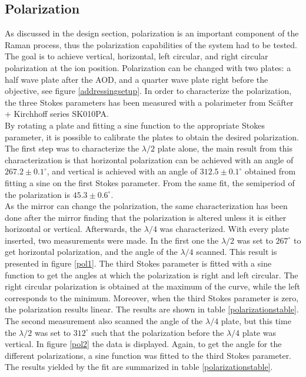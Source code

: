 \subsection{Polarization}
As discussed in the design section, polarization is an important component of the Raman process, thus the polarization capabilities of the system had to be tested. The goal is to achieve vertical, horizontal, left circular, and right circular polarization at the ion position. Polarization can be changed with two plates: a half wave plate after the AOD, and a quarter wave plate right before the objective, see figure \ref{addressingsetup}. In order to characterize the polarization, the three Stokes parameters \cite{stokes} has been measured with a polarimeter from Sc\"after + Kirchhoff series SK010PA.\\
By rotating a plate and fitting a sine function to the appropriate Stokes parameter, it is possible to calibrate the plates to obtain the desired polarization. The first step was to characterize the $\lambda/2$ plate alone, the main result from this characterization is that horizontal polarization can be achieved with an angle of $267.2\pm 0.1 ^{\circ}$, and vertical is achieved with an angle of $312.5\pm0.1^{\circ}$ obtained from fitting a sine on the first Stokes parameter. From the same fit, the semiperiod of the polarization is $45.3\pm 0.6^\circ$.\\
As the mirror can change the polarization, the same characterization has been done after the mirror finding that the polarization is altered unless it is either horizontal or vertical. Afterwards, the $\lambda/4$ was characterized. With every plate inserted, two measurements were made. In the first one the $\lambda/2$ was set to $267^\circ$ to get horizontal polarization, and the angle of the $\lambda/4$ scanned. This result is presented in figure \ref{pol1}. The third Stokes parameter is fitted with a sine function to get the angles at which the polarization is right and left circular. The right circular polarization is obtained at the maximum of the curve, while the left corresponds to the minimum. Moreover, when the third Stokes parameter is zero, the polarization results linear. The results are shown in table \ref{polarizationstable}.
The second measurement also scanned the angle of the $\lambda/4$ plate, but this time the $\lambda/2$ was set to $312^\circ$ such that the polarization before the $\lambda/4$ plate was vertical. In figure \ref{pol2} the data is displayed. Again, to get the angle for the different polarizations, a sine function was fitted to the third Stokes parameter. The results yielded by the fit are summarized in table \ref{polarizationstable}.

